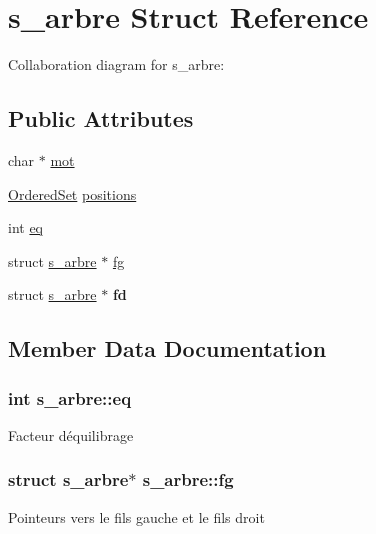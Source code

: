 \hypertarget{structs__arbre}{}\section{s\+\_\+arbre Struct Reference}
\label{structs__arbre}


Collaboration diagram for s\+\_\+arbre\+:
\subsection*{Public Attributes}
\begin{DoxyCompactItemize}
\item 
char $\ast$ \hyperlink{structs__arbre_a7853fb86d241c6569f3449e6589f3c8a}{mot}
\item 
\hyperlink{structs__set}{Ordered\+Set} \hyperlink{structs__arbre_af3754e685aace8398941e5a09190201c}{positions}
\item 
int \hyperlink{structs__arbre_a812df31061e80748e138fb2248556540}{eq}
\item 
struct \hyperlink{structs__arbre}{s\+\_\+arbre} $\ast$ \hyperlink{structs__arbre_ac3fec87fd94a912facfdf4c0ffef5ea3}{fg}
\item 
struct \hyperlink{structs__arbre}{s\+\_\+arbre} $\ast$ {\bfseries fd}\hypertarget{structs__arbre_a365d9e017f8667aa29a0b86f5b668350}{}\label{structs__arbre_a365d9e017f8667aa29a0b86f5b668350}

\end{DoxyCompactItemize}


\subsection{Member Data Documentation}
\subsubsection[{\texorpdfstring{eq}{eq}}]{\setlength{\rightskip}{0pt plus 5cm}int s\+\_\+arbre\+::eq}\hypertarget{structs__arbre_a812df31061e80748e138fb2248556540}{}\label{structs__arbre_a812df31061e80748e138fb2248556540}
Facteur d\textquotesingle{}équilibrage 
\subsubsection[{\texorpdfstring{fg}{fg}}]{\setlength{\rightskip}{0pt plus 5cm}struct {\bf s\+\_\+arbre}$\ast$ s\+\_\+arbre\+::fg}\hypertarget{structs__arbre_ac3fec87fd94a912facfdf4c0ffef5ea3}{}\label{structs__arbre_ac3fec87fd94a912facfdf4c0ffef5ea3}
Pointeurs vers le fils gauche et le fils droit 
